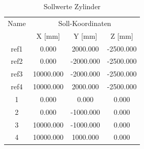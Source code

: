 \begin{table}[h]\label{tab:sollzylinder}
\centering
\caption{Sollwerte Zylinder}

\begin{tabular}{cccc}
\toprule
\multicolumn{1}{c|}{Name} &
\multicolumn{3}{c}{Soll-Koordinaten} \\
\multicolumn{1}{c|}{} &
\multicolumn{1}{c|}{X [mm]} &
\multicolumn{1}{c|}{Y [mm]} &
\multicolumn{1}{c}{Z [mm]} \\
\midrule

\multicolumn{1}{c|}{ref1} &
\multicolumn{1}{c|}{0.000} &
\multicolumn{1}{c|}{2000.000} &
\multicolumn{1}{c}{-2500.000} \\

\multicolumn{1}{c|}{ref2} &
\multicolumn{1}{c|}{0.000} &
\multicolumn{1}{c|}{-2000.000} &
\multicolumn{1}{c}{-2500.000} \\

\multicolumn{1}{c|}{ref3} &
\multicolumn{1}{c|}{10000.000} &
\multicolumn{1}{c|}{-2000.000} &
\multicolumn{1}{c}{-2500.000} \\

\multicolumn{1}{c|}{ref4} &
\multicolumn{1}{c|}{10000.000} &
\multicolumn{1}{c|}{2000.000} &
\multicolumn{1}{c}{-2500.000} \\

\multicolumn{1}{c|}{1} &
\multicolumn{1}{c|}{0.000} &
\multicolumn{1}{c|}{0.000} &
\multicolumn{1}{c}{0.000} \\

\multicolumn{1}{c|}{2} &
\multicolumn{1}{c|}{0.000} &
\multicolumn{1}{c|}{-1000.000} &
\multicolumn{1}{c}{0.000} \\

\multicolumn{1}{c|}{3} &
\multicolumn{1}{c|}{10000.000} &
\multicolumn{1}{c|}{-1000.000} &
\multicolumn{1}{c}{0.000} \\

\multicolumn{1}{c|}{4} &
\multicolumn{1}{c|}{10000.000} &
\multicolumn{1}{c|}{1000.000} &
\multicolumn{1}{c}{0.000} \\
\bottomrule
\end{tabular}
\end{table}

